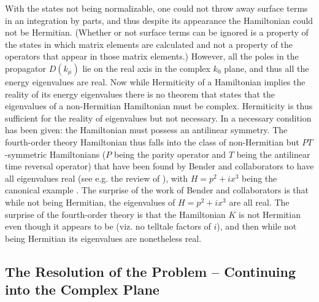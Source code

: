 \documentclass[aps]{revtex4}
\begin{document}
With the states not being normalizable, one could not throw away surface terms in an integration by parts, and thus despite its appearance the Hamiltonian could not be Hermitian. (Whether or not surface terms can be ignored is a property of the states in which matrix elements are calculated and not a property of the operators that appear in those matrix elements.) However, all the poles in the propagator $D(k_{\mu})$ lie on the real axis in the complex $k_0$ plane, and thus all the energy eigenvalues are real. Now while Hermiticity of a Hamiltonian implies the reality of its energy eigenvalues there is no theorem that states that the eigenvalues of a non-Hermitian Hamiltonian must be complex. Hermiticity is thus sufficient for the reality of eigenvalues but not necessary.  In \cite{Mannheim2018b,Mostafazadeh2002,Solombrino2002}  a necessary condition has been given: the Hamiltonian must possess an antilinear symmetry. The fourth-order theory Hamiltonian thus falls into the class of non-Hermitian but $PT$-symmetric Hamiltonians ($P$ being the parity operator and $T$ being the antilinear time reversal operator) that have been found by Bender and collaborators to have all eigenvalues real (see e.g. the review of \cite{Bender2007}), with $H=p^2+ix^3$ being the canonical example \cite{Bender1998,Bender1999}. The surprise of the work of Bender and collaborators is that while not being Hermitian, the eigenvalues of $H=p^2+ix^3$ are all real. The surprise of the fourth-order theory is that the Hamiltonian $K$ is not Hermitian even though it appears to be (viz. no telltale factors of $i$), and then while not being Hermitian its eigenvalues are nonetheless real.

\subsection{The Resolution of the Problem -- Continuing into the Complex Plane}
\end{document}
